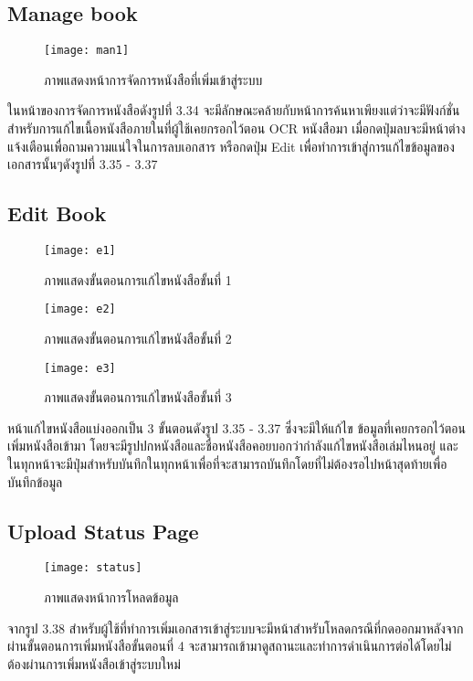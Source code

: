 \subsection{Manage book}
\begin{figure}[H]
    \centering
    \texttt{[image: man1]}
    \caption{ภาพแสดงหน้าการจัดการหนังสือที่เพิ่มเข้าสู่ระบบ}\label{fig:man1}
\end{figure}
ในหน้าของการจัดการหนังสือดังรูปที่ 3.34 จะมีลักษณะคล้ายกับหน้าการค้นหาเพียงแต่ว่าจะมีฟังก์ชั่นสำหรับการแก้ไขเนื้อหนังสือภายในที่ผู้ใช้เคยกรอกไว้ตอน OCR หนังสือมา เมื่อกดปุ่มลบจะมีหน้าต่างแจ้งเตือนเพื่อถามความแน่ใจในการลบเอกสาร หรือกดปุ่ม Edit เพื่อทำการเข้าสู่การแก้ไขข้อมูลของเอกสารนั้นๆดังรูปที่ 3.35 - 3.37

\subsection{Edit Book}
\begin{figure}[H]
    \centering
    \texttt{[image: e1]}
    \caption{ภาพแสดงขั้นตอนการแก้ไขหนังสือขั้นที่ 1}\label{fig:e1}
\end{figure}

\begin{figure}[H]
    \centering
    \texttt{[image: e2]}
    \caption{ภาพแสดงขั้นตอนการแก้ไขหนังสือขั้นที่ 2}\label{fig:e2}
\end{figure}

\begin{figure}[H]
    \centering
    \texttt{[image: e3]}
    \caption{ภาพแสดงขั้นตอนการแก้ไขหนังสือขั้นที่ 3}\label{fig:e3}
\end{figure}

หน้าแก้ไขหนังสือแบ่งออกเป็น 3 ขั้นตอนดังรูป 3.35 - 3.37 ซึ่งจะมีให้แก้ไข ข้อมูลที่เคยกรอกไว้ตอนเพิ่มหนังสือเข้ามา โดยจะมีรูปปกหนังสือและชื่อหนังสือคอยบอกว่ากำลังแก้ไขหนังสือเล่มไหนอยู่ และในทุกหน้าจะมีปุ่มสำหรับบันทึกในทุกหน้าเพื่อที่จะสามารถบันทึกโดยที่ไม่ต้องรอไปหน้าสุดท้ายเพื่อบันทึกข้อมูล

\subsection{Upload Status Page}
\begin{figure}[H]
    \centering
    \texttt{[image: status]}
    \caption{ภาพแสดงหน้าการโหลดข้อมูล}\label{fig:status}
\end{figure}
จากรูป 3.38 สำหรับผู้ใช้ที่ทำการเพิ่มเอกสารเข้าสู่ระบบจะมีหน้าสำหรับโหลดกรณีที่กดออกมาหลังจากผ่านขั้นตอนการเพิ่มหนังสือขั้นตอนที่ 4 จะสามารถเข้ามาดูสถานะและทำการดำเนินการต่อได้โดยไม่ต้องผ่านการเพิ่มหนังสือเข้าสู่ระบบใหม่


